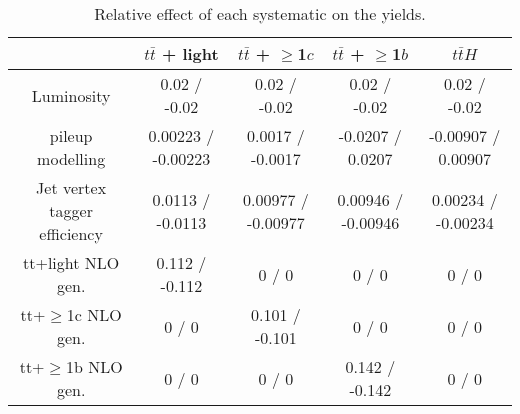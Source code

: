 \documentclass[10pt]{article}
\begin{document}
\begin{table}[htbp]
\begin{center}
\begin{tabular}{|c|c|c|c|c|}
\hline 
      & $t\bar{t}$ + light      & $t\bar{t}$ + $\geq$1$c$      & $t\bar{t}$ + $\geq$1$b$      & $t\bar{t}H$ \\ 
\hline 
  Luminosity & 0.02 / -0.02 & 0.02 / -0.02 & 0.02 / -0.02 & 0.02 / -0.02 \\ 
  pileup modelling & 0.00223 / -0.00223 & 0.0017 / -0.0017 & -0.0207 / 0.0207 & -0.00907 / 0.00907 \\ 
  Jet vertex tagger efficiency & 0.0113 / -0.0113 & 0.00977 / -0.00977 & 0.00946 / -0.00946 & 0.00234 / -0.00234 \\ 
  tt+light NLO gen. & 0.112 / -0.112 & 0 / 0 & 0 / 0 & 0 / 0 \\ 
  tt+$\geq$1c NLO gen. & 0 / 0 & 0.101 / -0.101 & 0 / 0 & 0 / 0 \\ 
  tt+$\geq$1b NLO gen. & 0 / 0 & 0 / 0 & 0.142 / -0.142 & 0 / 0 \\ 
\hline 
\end{tabular} 
\caption{Relative effect of each systematic on the yields.} 
\end{center} 
\end{table} 
\end{document}
